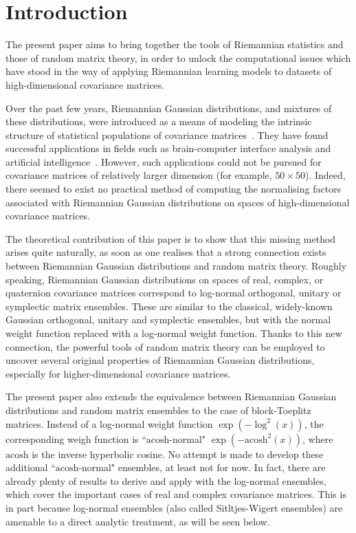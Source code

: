 \documentclass[draftclsnofoot]{IEEEtran}
\begin{document}
\IEEEpeerreviewmaketitle

\section{Introduction}
The present paper aims to bring together the tools of Riemannian statistics and those of random matrix theory, in order to unlock the computational issues which have stood in the way of applying Riemannian learning models to datasets of high-dimensional covariance matrices.

Over the past few years, Riemannian Gaussian distributions, and mixtures of these distributions, were introduced as a means of modeling the intrinsic structure of statistical populations of covariance matrices~\cite{Cheng2013,Sa16,Sa17}. They have found successful applications in fields such as brain-computer interface analysis and artificial intelligence~\cite{zanini2018}\cite{mathieu2019}. However, such applications could not be pursued for covariance matrices of relatively larger dimension (for example, $50 \times 50$). Indeed, there seemed to exist no practical method of computing the normalising factors associated with Riemannian Gaussian distributions on spaces of high-dimensional covariance matrices. 

The theoretical contribution of this paper is to show that this missing method arises quite naturally, as soon as one realises that a strong connection exists between Riemannian Gaussian distributions and random matrix theory. 
Roughly speaking, Riemannian Gaussian distributions on spaces of real, complex, or quaternion covariance matrices correspond to log-normal orthogonal, unitary or symplectic matrix ensembles. These are similar to the classical, widely-known Gaussian orthogonal, unitary and symplectic ensembles, but with the normal weight function replaced with a log-normal weight function. Thanks to this new connection, the powerful tools of random matrix theory can be employed to uncover several original properties of Riemannian Gaussian distributions, especially for higher-dimensional covariance matrices. 

The present paper also extends the equivalence between Riemannian Gaussian distributions and random matrix ensembles to the case of block-Toeplitz matrices. Instead of a log-normal weight function $\exp(-\log^2(x))$, the corresponding weigh function is ``$\mathrm{acosh}$-normal" $\exp(-\mathrm{acosh}^2(x))$, where $\mathrm{acosh}$ is the inverse hyperbolic cosine.
No attempt is made to develop these additional ``$\mathrm{acosh}$-normal" ensembles, at least not for now. In fact, there are already plenty of results to derive and apply with the log-normal ensembles, which cover the important cases of real and complex covariance matrices. This is in part because log-normal ensembles (also called Sitltjes-Wigert ensembles) are amenable to a direct analytic treatment, as will be seen below.
\end{document}
